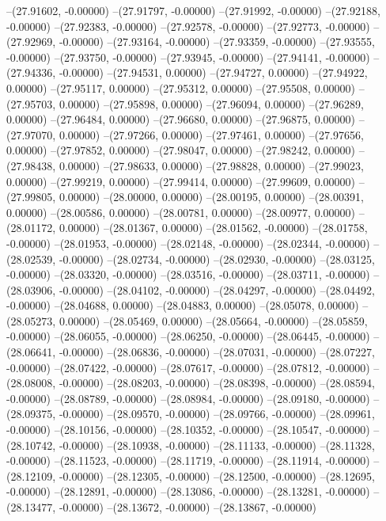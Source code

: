 --(27.91602, -0.00000)
--(27.91797, -0.00000)
--(27.91992, -0.00000)
--(27.92188, -0.00000)
--(27.92383, -0.00000)
--(27.92578, -0.00000)
--(27.92773, -0.00000)
--(27.92969, -0.00000)
--(27.93164, -0.00000)
--(27.93359, -0.00000)
--(27.93555, -0.00000)
--(27.93750, -0.00000)
--(27.93945, -0.00000)
--(27.94141, -0.00000)
--(27.94336, -0.00000)
--(27.94531, 0.00000)
--(27.94727, 0.00000)
--(27.94922, 0.00000)
--(27.95117, 0.00000)
--(27.95312, 0.00000)
--(27.95508, 0.00000)
--(27.95703, 0.00000)
--(27.95898, 0.00000)
--(27.96094, 0.00000)
--(27.96289, 0.00000)
--(27.96484, 0.00000)
--(27.96680, 0.00000)
--(27.96875, 0.00000)
--(27.97070, 0.00000)
--(27.97266, 0.00000)
--(27.97461, 0.00000)
--(27.97656, 0.00000)
--(27.97852, 0.00000)
--(27.98047, 0.00000)
--(27.98242, 0.00000)
--(27.98438, 0.00000)
--(27.98633, 0.00000)
--(27.98828, 0.00000)
--(27.99023, 0.00000)
--(27.99219, 0.00000)
--(27.99414, 0.00000)
--(27.99609, 0.00000)
--(27.99805, 0.00000)
--(28.00000, 0.00000)
--(28.00195, 0.00000)
--(28.00391, 0.00000)
--(28.00586, 0.00000)
--(28.00781, 0.00000)
--(28.00977, 0.00000)
--(28.01172, 0.00000)
--(28.01367, 0.00000)
--(28.01562, -0.00000)
--(28.01758, -0.00000)
--(28.01953, -0.00000)
--(28.02148, -0.00000)
--(28.02344, -0.00000)
--(28.02539, -0.00000)
--(28.02734, -0.00000)
--(28.02930, -0.00000)
--(28.03125, -0.00000)
--(28.03320, -0.00000)
--(28.03516, -0.00000)
--(28.03711, -0.00000)
--(28.03906, -0.00000)
--(28.04102, -0.00000)
--(28.04297, -0.00000)
--(28.04492, -0.00000)
--(28.04688, 0.00000)
--(28.04883, 0.00000)
--(28.05078, 0.00000)
--(28.05273, 0.00000)
--(28.05469, 0.00000)
--(28.05664, -0.00000)
--(28.05859, -0.00000)
--(28.06055, -0.00000)
--(28.06250, -0.00000)
--(28.06445, -0.00000)
--(28.06641, -0.00000)
--(28.06836, -0.00000)
--(28.07031, -0.00000)
--(28.07227, -0.00000)
--(28.07422, -0.00000)
--(28.07617, -0.00000)
--(28.07812, -0.00000)
--(28.08008, -0.00000)
--(28.08203, -0.00000)
--(28.08398, -0.00000)
--(28.08594, -0.00000)
--(28.08789, -0.00000)
--(28.08984, -0.00000)
--(28.09180, -0.00000)
--(28.09375, -0.00000)
--(28.09570, -0.00000)
--(28.09766, -0.00000)
--(28.09961, -0.00000)
--(28.10156, -0.00000)
--(28.10352, -0.00000)
--(28.10547, -0.00000)
--(28.10742, -0.00000)
--(28.10938, -0.00000)
--(28.11133, -0.00000)
--(28.11328, -0.00000)
--(28.11523, -0.00000)
--(28.11719, -0.00000)
--(28.11914, -0.00000)
--(28.12109, -0.00000)
--(28.12305, -0.00000)
--(28.12500, -0.00000)
--(28.12695, -0.00000)
--(28.12891, -0.00000)
--(28.13086, -0.00000)
--(28.13281, -0.00000)
--(28.13477, -0.00000)
--(28.13672, -0.00000)
--(28.13867, -0.00000)
